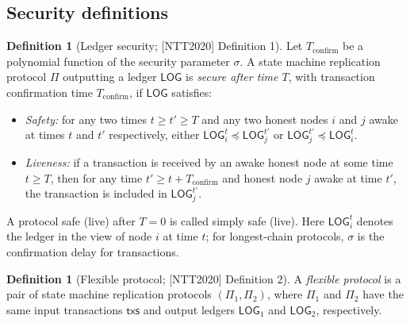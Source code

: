 \documentclass[11pt,a4paper]{article}
\theoremstyle{definition}
\newtheorem{definition}[theorem]{Definition}
\begin{document}
\subsection{Security definitions}\label{sec:xl-security-defs}

\begin{definition}[Ledger security; {[NTT2020]} Definition 1]
\label{def:xl-ledger-security}
Let $T_{\mathrm{confirm}}$ be a polynomial function of the security
parameter $\sigma$. A state machine replication protocol $\Pi$ outputting
a ledger $\mathsf{LOG}$ is \emph{secure after time $T$}, with transaction
confirmation time $T_{\mathrm{confirm}}$, if $\mathsf{LOG}$ satisfies:
\begin{itemize}
\item \emph{Safety:} for any two times $t \ge t' \ge T$ and any two honest
  nodes $i$ and $j$ awake at times $t$ and $t'$ respectively, either
  $\mathsf{LOG}_i^t \preceq \mathsf{LOG}_j^{t'}$ or
  $\mathsf{LOG}_j^{t'} \preceq \mathsf{LOG}_i^t$.
\item \emph{Liveness:} if a transaction is received by an awake honest
  node at some time $t \ge T$, then for any time
  $t' \ge t + T_{\mathrm{confirm}}$ and honest node $j$ awake at time
  $t'$, the transaction is included in $\mathsf{LOG}_j^{t'}$.
\end{itemize}
A protocol safe (live) after $T = 0$ is called simply safe (live). Here
$\mathsf{LOG}_i^t$ denotes the ledger in the view of node $i$ at time $t$;
for longest-chain protocols, $\sigma$ is the confirmation delay for
transactions.
\end{definition}

\begin{definition}[Flexible protocol; {[NTT2020]} Definition 2]
\label{def:xl-flexible}
A \emph{flexible protocol} is a pair of state machine replication
protocols $(\Pi_1, \Pi_2)$, where $\Pi_1$ and $\Pi_2$ have the same input
transactions $\mathsf{txs}$ and output ledgers $\mathsf{LOG}_1$ and
$\mathsf{LOG}_2$, respectively.
\end{definition}
\end{document}
